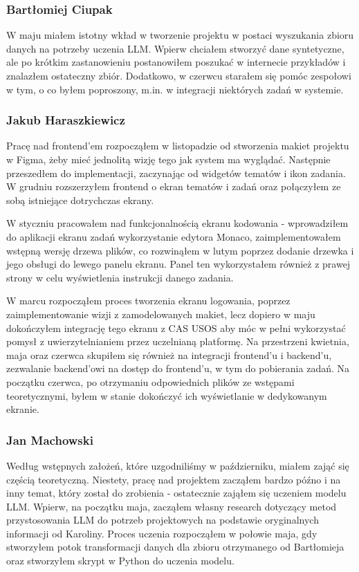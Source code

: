 \documentclass[12pt,a4paper]{article}
\begin{document}
\subsubsection*{Bartłomiej Ciupak}
W maju miałem istotny wkład w tworzenie projektu w postaci wyszukania zbioru danych na potrzeby uczenia LLM. Wpierw chciałem stworzyć dane syntetyczne, ale po krótkim zastanowieniu postanowiłem poszukać w internecie przykładów i znalazłem ostateczny zbiór. Dodatkowo, w czerwcu starałem się pomóc zespołowi w tym, o co byłem poproszony, m.in. w integracji niektórych zadań w systemie. 

\subsubsection*{Jakub Haraszkiewicz}
Pracę nad frontend'em rozpocząłem w listopadzie od stworzenia makiet projektu w Figma, żeby mieć jednolitą wizję tego jak system ma wyglądać. Następnie przeszedłem do implementacji, zaczynając od widgetów tematów i ikon zadania. W grudniu rozszerzyłem frontend o ekran tematów i zadań oraz połączyłem ze sobą istniejące dotrychczas ekrany. 

W styczniu pracowałem nad funkcjonalnością ekranu kodowania - wprowadziłem do aplikacji ekranu zadań wykorzystanie edytora Monaco, zaimplementowałem wstępną wersję drzewa plików, co rozwinąłem w lutym poprzez dodanie drzewka i jego obsługi do lewego panelu ekranu. Panel ten wykorzystałem również z prawej strony w celu wyświetlenia instrukcji danego zadania.

W marcu rozpocząłem proces tworzenia ekranu logowania, poprzez zaimplementowanie wizji z zamodelowanych makiet, lecz dopiero w maju dokończyłem integrację tego ekranu z CAS USOS aby móc w pełni wykorzystać pomysł z uwierzytelnianiem przez uczelnianą platformę. Na przestrzeni kwietnia, maja oraz czerwca skupiłem się również na integracji frontend'u i backend'u, zezwalanie backend'owi na dostęp do frontend'u, w tym do pobierania zadań. Na początku czerwca, po otrzymaniu odpowiednich plików ze wstępami teoretycznymi, byłem w stanie dokończyć ich wyświetlanie w dedykowanym ekranie. 

\subsubsection*{Jan Machowski}
Według wstępnych założeń, które uzgodniliśmy w październiku, miałem zająć się częścią teoretyczną. Niestety, pracę nad projektem zacząłem bardzo późno i na inny temat, który został do zrobienia - ostatecznie zająłem się uczeniem modelu LLM. Wpierw, na początku maja, zacząłem własny research dotyczący metod przystosowania LLM do potrzeb projektowych na podstawie oryginalnych informacji od Karoliny. Proces uczenia rozpocząłem w połowie maja, gdy stworzyłem potok transformacji danych dla zbioru otrzymanego od Bartłomieja oraz stworzyłem skrypt w Python do uczenia modelu.
\end{document}
